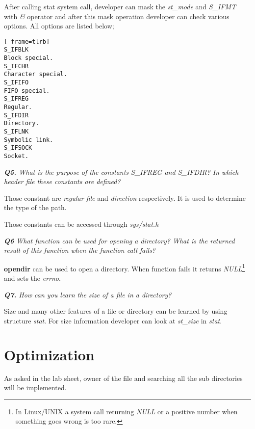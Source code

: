 \documentclass[11pt]{article}
\begin{document}
After calling stat system call, developer can mask the \textit{st\_mode} and \textit{S\_IFMT} with \textit{\&} operator and after this mask operation developer can check various options. All options are listed below;

\vspace{5mm}
\begin{minipage}{1\textwidth}
\begin{lstlisting}[ frame=tlrb]
S_IFBLK
Block special.
S_IFCHR
Character special.
S_IFIFO
FIFO special.
S_IFREG
Regular.
S_IFDIR
Directory.
S_IFLNK
Symbolic link.
S_IFSOCK
Socket. 
\end{lstlisting}
\end{minipage}

\vspace{5mm}
\textit{\textbf{Q5.} What is the purpose of the constants S\_IFREG and S\_IFDIR? In which header file these constants are defined?}
\vspace{5mm}

Those constant are \textit{regular file} and \textit{direction} respectively. It is used to determine the type of the path. 

Those constants can be accessed through \textit{sys/stat.h}

\vspace{5mm}
\textit{\textbf{Q6} What function can be used for opening a directory? What is the returned result of this function when the function call fails?}
\vspace{5mm}

\textbf{opendir} can be used to open a directory. When function fails it returns \textit{NULL}\footnote{In Linux/UNIX a system call returning \textit{NULL} or a positive number when something goes wrong is too rare.} and sets the \textit{errno}.

\vspace{5mm}
\textit{\textbf{Q7.} How can you learn the size of a file in a directory?}
\vspace{5mm}

Size and many other features of a file or directory can be learned by using structure \textit{stat}. For size information developer can look at \textit{st\_size} in \textit{stat}.


\section*{Optimization}

As asked in the lab sheet, owner of the file and searching all the sub directories will be implemented.
\end{document}
